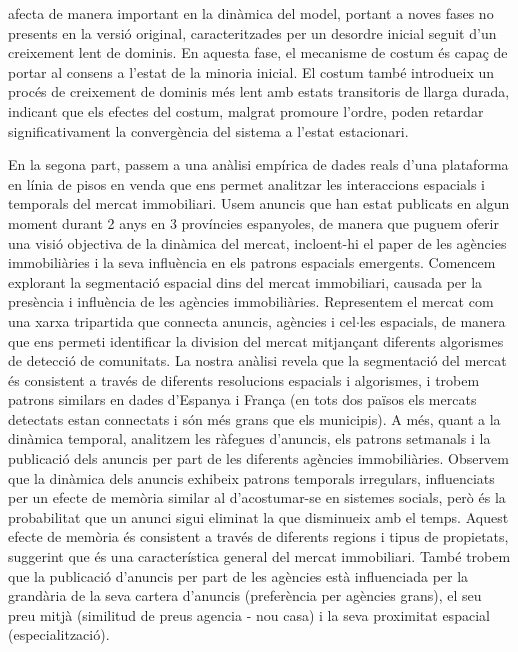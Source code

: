 afecta de manera important en la dinàmica del model, portant a noves fases no presents en la versió original, caracteritzades per un desordre inicial seguit d'un creixement lent de dominis. En aquesta fase, el mecanisme de costum és capaç de portar al consens a l'estat de la minoria inicial. El costum també introdueix un procés de creixement de dominis més lent amb estats transitoris de llarga durada, indicant que els efectes del costum, malgrat promoure l'ordre, poden retardar significativament la convergència del sistema a l'estat estacionari.

En la segona part, passem a una anàlisi empírica de dades reals d'una plataforma en línia de pisos en venda que ens permet analitzar les interaccions espacials i temporals del mercat immobiliari. Usem anuncis que han estat publicats en algun moment durant 2 anys en 3 províncies espanyoles, de manera que puguem oferir una visió objectiva de la dinàmica del mercat, incloent-hi el paper de les agències immobiliàries i la seva influència en els patrons espacials emergents. Comencem explorant la segmentació espacial dins del mercat immobiliari, causada per la presència i influència de les agències immobiliàries. Representem el mercat com una xarxa tripartida que connecta anuncis, agències i cel$\cdot$les espacials, de manera que ens permeti identificar la division del mercat mitjançant diferents algorismes de detecció de comunitats. La nostra anàlisi revela que la segmentació del mercat és consistent a través de diferents resolucions espacials i algorismes, i trobem patrons similars en dades d'Espanya i França (en tots dos països els mercats detectats estan connectats i són més grans que els municipis). A més, quant a la dinàmica temporal, analitzem les ràfegues d'anuncis, els patrons setmanals i la publicació dels anuncis per part de les diferents agències immobiliàries. Observem que la dinàmica dels anuncis exhibeix patrons temporals irregulars, influenciats per un efecte de memòria similar al d'acostumar-se en sistemes socials, però és la probabilitat que un anunci sigui eliminat la que disminueix amb el temps. Aquest efecte de memòria és consistent a través de diferents regions i tipus de propietats, suggerint que és una característica general del mercat immobiliari. També trobem que la publicació d'anuncis per part de les agències està influenciada per la grandària de la seva cartera d'anuncis (preferència per agències grans), el seu preu mitjà (similitud de preus agencia - nou casa) i la seva proximitat espacial (especialització).

